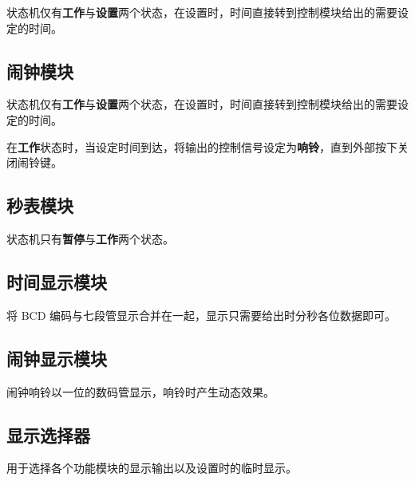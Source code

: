 \documentclass[lang=cn,11pt,a4paper,cite=authoryear]{elegantpaper}
\begin{document}
状态机仅有\textbf{工作}与\textbf{设置}两个状态，在设置时，时间直接转到控制模块给出的需要设定的时间。


\subsection{闹钟模块}

状态机仅有\textbf{工作}与\textbf{设置}两个状态，在设置时，时间直接转到控制模块给出的需要设定的时间。

在\textbf{工作}状态时，当设定时间到达，将输出的控制信号设定为\textbf{响铃}，直到外部按下关闭闹铃键。

\subsection{秒表模块}

状态机只有\textbf{暂停}与\textbf{工作}两个状态。

\subsection{时间显示模块}

将 BCD 编码与七段管显示合并在一起，显示只需要给出时分秒各位数据即可。

\subsection{闹钟显示模块}

闹钟响铃以一位的数码管显示，响铃时产生动态效果。

\subsection{显示选择器}

用于选择各个功能模块的显示输出以及设置时的临时显示。



\end{document}
